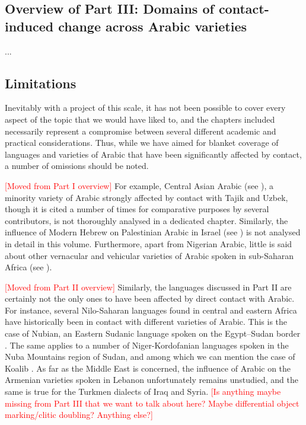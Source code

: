 \documentclass[output=paper]{langsci/langscibook}
\begin{document}
\subsection{Overview of Part III: Domains of contact-induced
change across Arabic varieties}\label{intropartIIIoverview}
...

\subsection{Limitations}\label{introlimitations}

Inevitably with a project of this scale, it has not been possible to cover every  aspect of the topic that we would have liked to, and the chapters included necessarily represent a compromise between several different academic and practical considerations. Thus, while we have aimed for blanket coverage of languages and varieties of Arabic that have been significantly affected by contact, a number of omissions should be noted. 

\textcolor{red}{[Moved from Part I overview]} For example, Central Asian Arabic (see \citealt{Seeger2013article}), a minority variety of Arabic strongly affected by contact with Tajik and Uzbek, though it is cited a number of times for comparative purposes by several contributors, is not thoroughly analysed in a dedicated chapter. Similarly, the influence of Modern Hebrew on Palestinian Arabic in Israel (see \citealt{Horesh2015}) is not analysed in detail in this volume. Furthermore, apart from Nigerian Arabic, little is said about other vernacular and vehicular varieties of Arabic spoken in sub-Saharan Africa (see \citealt{Lafkioui2013book}).

\textcolor{red}{[Moved from Part II overview]} Similarly, the languages discussed in Part II are certainly not the only ones to have been affected by direct contact with Arabic. For instance, several Nilo-Saharan languages found in central and eastern Africa have historically been in contact with different varieties of Arabic. This is the case of Nubian, an Eastern Sudanic language spoken on the Egypt--Sudan border \citep{Rouchdy1980}. The same applies to a number of Niger-Kordofanian languages spoken in the Nuba Mountains region of Sudan, and among which we can mention the case of Koalib \citep{Quint2018}. As far as the Middle East is concerned, the influence of Arabic on the Armenian varieties spoken in Lebanon unfortunately remains unstudied, and the same is true for the Turkmen dialects of Iraq and Syria. \textcolor{red}{[Is anything maybe missing from Part III that we want to talk about here? Maybe differential object marking/clitic doubling? Anything else?]} 
\end{document}
